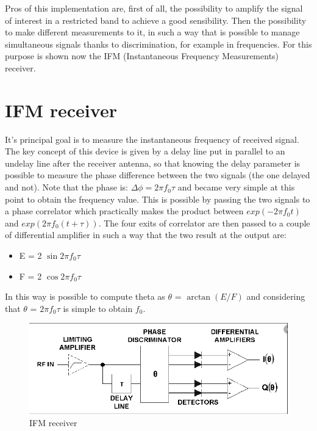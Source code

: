 \documentclass[12pt]{report}
\begin{document}
Pros of this implementation are, first of all, the possibility to amplify the signal of interest in a restricted band to achieve a good sensibility. Then the possibility to make different measurements to it, in such a way that is possible to manage simultaneous signals thanks to discrimination, for example in frequencies. For this purpose is shown now the IFM (Instantaneous Frequency Measurements) receiver.
\section{IFM receiver} It's principal goal is to measure the instantaneous frequency of received signal. The key concept of this device is given by a delay line put in parallel to an undelay line after the receiver antenna, so that knowing the delay parameter is possible to measure the phase difference between the two signals (the one delayed and not). Note that the phase is: $\Delta \phi = 2 \pi f_{0} \tau$ and became very simple at this point to obtain the frequency value. This is possible by passing the two signals to a phase correlator which practically makes the product between $exp(-2 \pi f_{0} t)$ and $exp(2 \pi f_{0} (t + \tau))$. The four exits of correlator are then passed to a couple of differential amplifier in such a way that the two result at the output are: 

\begin{itemize}
         \item E = 2 $\sin{2\pi f_{0}\tau}$
         \item F = 2 $\cos{2\pi f_{0}\tau}$
\end{itemize}

In this way is possible to compute theta as $\theta$ = $\arctan(E/F)$ and considering that $\theta$ = $2 \pi f_{0} \tau$ is simple to obtain $f_{0}$. 
\begin{figure}[h!]
    \centering
    \includegraphics[width=12cm]{Pictures/IFM receiver.png}
    \caption{IFM receiver}
\end{figure}
\newpage
\end{document}

